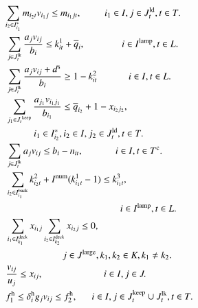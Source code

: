 \documentclass[a4j,11pt,twocolumn]{jsarticle}
\begin{document}
\newpage

\begin{align}
  &\hspace{0.8em} \sum_{i_2 \in {I_{i_1}^*}} {m_{i_2t} v_{i_1j}} \leq {m_{i_1jt}}, \hspace{2.4em} i_1 \in I, j \in J_{t}^{\rm{ld}}, t \in T. \\
  &\hspace{1.0em} \sum_{j \in J_{t}^{\rm{lk}}} \frac{a_{j} v_{ij}} {b_{i}} \leq k^1_{it} + \overline{q}_{i}, \hspace{3.85em} i \in I^{\rm{lamp}}, t \in L. \\
  &\hspace{1.0em} \sum_{j \in J_{t}^{\rm{lk}}} \frac{a_{j} v_{ij} + d^{\rm{s}}} {b_{i}}  \geq 1 - k^2_{it}  \hspace{3.28em} i \in I, t \in L. \\
  &\hspace{1.0em} \sum_{j_1\in {J_t}^{\rm{keep}}} \frac{a_{j_1} v_{i_1j_1}} {b_{i_1}} \leq \overline{q}_{i_2} + 1 - {x_{i_2j_2}}, \notag \\
  &\hspace{3.91em} i_1 \in {I_{i_2}^*}, i_2 \in I, j_2 \in J_{t}^{\rm{ld}}, t \in T. \\
  &\hspace{1.0em} \sum_{j \in J_{t}^{\rm{lk}}} a_j v_{ij}  \leq b_{i} - n_{it}, \hspace{3.37em} i \in I, t \in T^{\rm{c}}. \\
  &\hspace{1.0em} \sum_{i_2 \in I_{i_1}^{\rm{back}}} k^2_{i_2t} + I^{\rm{num}} (k^1_{i_1t} - 1) \leq  k^3_{i_1t}, \notag \\
  &\hspace{12.91em} i \in I^{\rm{lamp}}, t \in L. \\
  &\hspace{1.0em} \sum_{i_1 \in I_{k_{1}}^{\rm{deck}}} x_{i_1j} \sum_{i_2 \in I_{k_{2}}^{\rm{deck}}} x_{i_2j} \leq 0, \notag \\
  &\hspace{6.91em} j \in J^{\rm{large}}, k_1, k_2 \in K, k_1 \neq k_2. \\
  &\hspace{1.0em} \frac{v_{ij}} {u_j} \leq x_{ij}, \hspace{6.33em} i \in I, j \in J. \\
  &\hspace{1.0em} {f^{\rm{h}}_1} \leq {\delta_{i}^{\rm{h}}}{g_{j}} {v_{ij}} \leq f^{\rm{h}}_2, \hspace{1.5em} i \in I, j \in J_{t}^{\rm{keep}} \cup J_{t}^{\rm{lk}}, t \in T. \\

\end{align}
\end{document}
